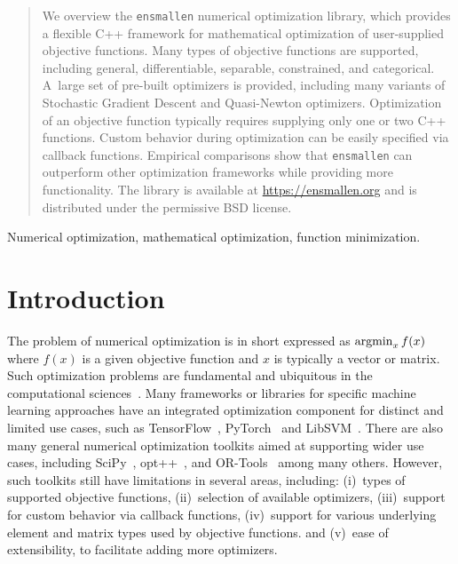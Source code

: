 \documentclass[twoside,11pt]{article}
\begin{document}
\begin{abstract}%
We overview the {\tt ensmallen} numerical optimization library,
which provides a flexible C++ framework
for mathematical optimization of user-supplied objective functions.
Many types of objective functions are supported,
including general, differentiable, separable, constrained, and categorical.
A~large set of pre-built optimizers is provided,
including many variants of Stochastic Gradient Descent and Quasi-Newton optimizers.
Optimization of an objective function typically requires supplying only one or two C++ functions.
Custom behavior during optimization can be easily specified via callback functions.
Empirical comparisons show that {\tt ensmallen}
can outperform other optimization frameworks while providing more functionality.
The library is available at \url{https://ensmallen.org}
and is distributed under the permissive BSD license.

\end{abstract}

\begin{keywords}
  Numerical optimization, mathematical optimization, function minimization.
\end{keywords}


\section{Introduction}

The problem of numerical optimization is in short expressed as
$\operatornamewithlimits{argmin}_x f(x)$
where $f(x)$ is a given objective function and $x$ is typically a vector or matrix.
Such optimization problems are fundamental and ubiquitous in the computational sciences~\citep{Nocedal_2006}.
Many frameworks or libraries for specific machine learning approaches
have an integrated optimization component for distinct and limited use cases,
such as
TensorFlow~\citep{tensorflow2015-whitepaper},
PyTorch~\citep{NEURIPS2019_9015}
and LibSVM~\citep{libsvm2011}.
There are also many general numerical optimization toolkits
aimed at supporting wider use cases,
including SciPy~\citep{2019arXiv190710121V},
opt++~\citep{meza1994opt++},
and 
OR-Tools~\citep{ortools} among many others.
However, such toolkits still have limitations in several areas,
including:
(i)~types of supported objective functions,
(ii)~selection of available optimizers,
(iii)~support for custom behavior via callback functions,
(iv)~support for various underlying element and matrix types used by objective functions.
and
(v)~ease of extensibility, to facilitate adding more optimizers.
\end{document}
